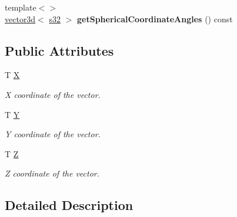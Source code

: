 \begin{DoxyCompactItemize}
\item 
{\footnotesize template$<$$>$ }\\\hyperlink{classirr_1_1core_1_1vector3d}{vector3d}$<$ \hyperlink{namespaceirr_ac66849b7a6ed16e30ebede579f9b47c6}{s32} $>$ {\bfseries get\+Spherical\+Coordinate\+Angles} () const\hypertarget{classirr_1_1core_1_1vector3d_aa11de50e7f575c6c282de66417279444}{}\label{classirr_1_1core_1_1vector3d_aa11de50e7f575c6c282de66417279444}

\end{DoxyCompactItemize}
\subsection*{Public Attributes}
\begin{DoxyCompactItemize}
\item 
T \hyperlink{classirr_1_1core_1_1vector3d_a8c9ed06774dc668112bcefacb6e7732b}{X}\hypertarget{classirr_1_1core_1_1vector3d_a8c9ed06774dc668112bcefacb6e7732b}{}\label{classirr_1_1core_1_1vector3d_a8c9ed06774dc668112bcefacb6e7732b}

\begin{DoxyCompactList}\small\item\em X coordinate of the vector. \end{DoxyCompactList}\item 
T \hyperlink{classirr_1_1core_1_1vector3d_af8f87c2fe0ce717ade7c3d7419302fbd}{Y}\hypertarget{classirr_1_1core_1_1vector3d_af8f87c2fe0ce717ade7c3d7419302fbd}{}\label{classirr_1_1core_1_1vector3d_af8f87c2fe0ce717ade7c3d7419302fbd}

\begin{DoxyCompactList}\small\item\em Y coordinate of the vector. \end{DoxyCompactList}\item 
T \hyperlink{classirr_1_1core_1_1vector3d_ac2beb702e718c3579971348981b220ed}{Z}\hypertarget{classirr_1_1core_1_1vector3d_ac2beb702e718c3579971348981b220ed}{}\label{classirr_1_1core_1_1vector3d_ac2beb702e718c3579971348981b220ed}

\begin{DoxyCompactList}\small\item\em Z coordinate of the vector. \end{DoxyCompactList}\end{DoxyCompactItemize}


\subsection{Detailed Description}
